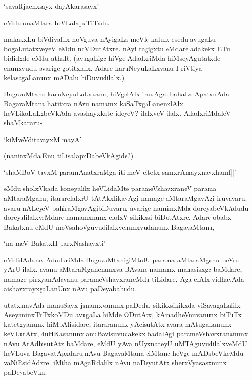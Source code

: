 \begin{shloka}
`savaRjacnxsayx dayAkarasayx'
\end{shloka}

\noindent eMdu anaMtara heVLalapxTiTxde.

makakxLu biVdiyalilx hoVguva nAyigaLa meVle kalulx esedu avugaLu bogaLutatxveyeV eMdu noVDutAtxre. nAyi tagigxtu eMdare adakekx ETu bididxde eMdu athaR. (avugaLige hiVge AdadxriMda hiMseyAgutatxde enunxvudu avarige gotitxlalx. Adare karuNeyuLaLxvanu I riVtiya kelasagaLanunx mADalu biDuvudilalx.) 

BagavaMtanu karuNeyuLaLxvanu, hiVgelAlx iruvAga. bahaLa ApatxnAda BagavaMtana hatitxra nAvu namamx kaSaTxgaLanenxlAlx heVLikoLaLxbeVkAda avashayxkate ideyeV? ilalxveV ilalx. AdadxriMdaleV shaMkararu-

\begin{shloka}
`kiMveVditavayxM mayA'
\end{shloka}
(naninxMda Enu tiLisalapxDabeVkAgide?)

\begin{shloka}
`shaMBoV tavxM paramAnatxraMga iti meV citetx samxrAmayxnavxhamf||'
\end{shloka}

\noindent eMdu sholxVkada koneyalilx heVLidaMte parameVshavxraneV parama aMtaraMganu, itararelalxrU tAtAkxlikavAgi namage aMtaraMgavAgi iruvavaru. avaru nALeyeV bahiraMgavAgibiDuvaru. avarige namimxMda doreyabeVkAdudu doreyalilalxveMdare namamxnunx elolxV sikikxsi biDutAtxre. Adare obabx Bakatxnu eMdU moVsahoVguvudilalxvenunxvudanunx BagavaMtanu,

\begin{shloka}
`na meV BakatxH parxNashayxti'
\end{shloka}

\noindent eMdidAdxne. AdadxriMda BagavaMtanigiMtalU parama aMtaraMganu beVre yArU ilalx. avanu aMtaraMganenunxva BAvane namamx manasisxge baMdare, namage pirxyanAdavanu parameVshavxraneMdu tiLidare, Aga elAlx vidhavAda aishavxrayxgaLanUnx nAvu paDeyabahudu.

utatxmavAda manuSayx janamxvanunx paDedu, sikikxsikikxda viSayagaLalilx AseyaninxTuTxkoMDu avugaLa hiMde ODutAtx, kAmadheVnuvanunx biTuTx katetxyanunx hiMbAlisidare, itararanunx yAcisutAtx avara mAtugaLanunx keVLutAtx, duHKavanunx anuBavisuvudakekx badalAgi parameVshavxrananunx nAvu ArAdhisutAtx baMdare, eMdU yAva nUyxnateyU uMTAguvudilalxveMdU heVLuva BagavatApxdaru nAvu BagavaMtana ciMtane heVge mADabeVkeMdu vaNiRsidAdxre. iMtha mAgaRdalilx nAvu naDeyutAtx sherxVyasasxnunx paDeyabeVku.


\endchapter
